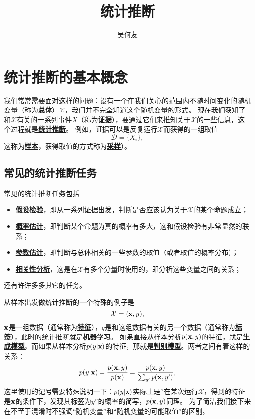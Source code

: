 \documentclass[hyperref, UTF8, a4paper]{ctexart}
\title{统计推断}
\author{吴何友}
\newcommand*{\concept}[1]{\underline{\textbf{#1}}}
\begin{document}
\maketitle

\section{统计推断的基本概念}

我们常常需要面对这样的问题：设有一个在我们关心的范围内不随时间变化的随机变量（称为\concept{总体}）$\mathcal{X}$，我们并不完全知道这个随机变量的形式。
现在我们获知了和$\mathcal{X}$有关的一系列事件$X$（称为\concept{证据}），要通过它们来推知关于$\mathcal{X}$的一些信息，这个过程就是\concept{统计推断}。
例如，证据可以是反复运行$\mathcal{X}$而获得的一组取值
\begin{equation}
    \mathcal{D} = \{X_i\},
\end{equation}
这称为\concept{样本}，获得取值的方式称为\concept{采样}）。

\subsection{常见的统计推断任务}

常见的统计推断任务包括
\begin{itemize}
    \item \concept{假设检验}，即从一系列证据出发，判断是否应该认为关于$\mathcal{X}$的某个命题成立；
    \item \concept{概率估计}，即判断某个命题为真的概率有多大，这和假设检验有非常显然的联系；
    \item \concept{参数估计}，即判断与总体相关的一些参数的取值（或者取值的概率分布）；
    \item \concept{相关性分析}，这是在$\mathcal{X}$有多个分量时使用的，即分析这些变量之间的关系；
\end{itemize}
还有许许多多其它的任务。

从样本出发做统计推断的一个特殊的例子是
\begin{equation}
    \mathcal{X} = (\vb{x}, y),
\end{equation}
$\vb{x}$是一组数据（通常称为\concept{特征}），$y$是和这组数据有关的另一个数据（通常称为\concept{标签}），此时的统计推断就是\concept{机器学习}。
如果直接从样本分析$p(\vb{x}, y)$的特征，就是\concept{生成模型}，而如果从样本分析$p(y|\vb{x})$的特征，那就是\concept{判别模型}。两者之间有着这样的关系：
\begin{equation}
    p(y | \vb{x}) = \frac{p(\vb{x}, y)}{p(\vb{x})} = \frac{p(\vb{x}, y)}{\sum_{y'} p(\vb{x}, y')}, 
\end{equation}
这里使用的记号需要特殊说明一下：$p(y | \vb{x})$实际上是“在某次运行$\mathcal{X}$，得到的特征是$\vb{x}$的条件下，发现其标签为$y$”的概率的简写，$p(\vb{x}, y)$同理。
为了简洁我们接下来在不至于混淆时不强调“随机变量”和“随机变量的可能取值”的区别。
\end{document}
